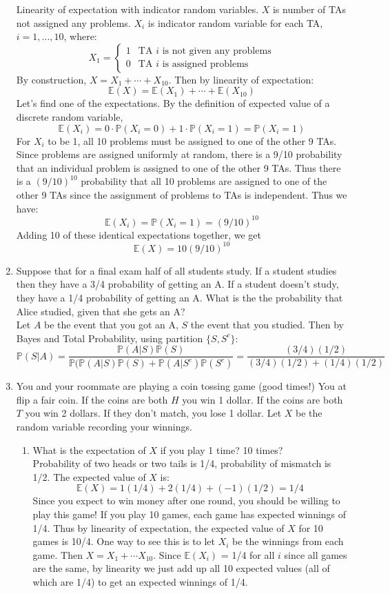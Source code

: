 \documentclass[12pt]{article}
\def\P{{\mathbb P}}
\def\E{{\mathbb E}}
\begin{document}
\begin{enumerate}
Linearity of expectation with indicator random variables. $X$ is number of TAs not assigned any problems. $X_i$ is indicator random variable for each TA, $i = 1, \dots, 10$, where:
\[
X_1 = \begin{cases}
1 & \text{TA $i$ is not given any problems}\\
0 & \text{TA $i$ is assigned problems}
\end{cases}
\]
By construction, $X = X_1 + \cdots + X_{10}$. Then by linearity of expectation:
\[
\E(X) = \E(X_1) + \cdots + \E(X_{10}) 
\]
Let's find one of the expectations. By the definition of expected value of a discrete random variable,
\[
\E(X_i) = 0 \cdot \P(X_i = 0) + 1 \cdot \P(X_i = 1) = \P(X_i = 1)
\]
For $X_i$ to be 1, all 10 problems must be assigned to one of the other 9 TAs. Since problems are assigned uniformly at random, there is a 9/10 probability that an individual problem is assigned to one of the other 9 TAs. Thus there is a $(9/10)^10$ probability that all 10 problems are assigned to one of the other 9 TAs since the assignment of problems to TAs is independent. Thus we have:
\[
\E(X_i) = \P(X_i = 1) = (9/10)^10
\]
Adding 10 of these identical expectations together, we get
\[
\E(X) = 10 (9/10)^10
\]

\item Suppose that for a final exam half of all students study. If a student studies then they have a 3/4 probability of getting an A. If a student doesn’t study, they have a 1/4 probability of getting an A. What is the the probability that Alice studied, given that she gets an A?\\

Let $A$ be the event that you got an A, $S$ the event that you studied. Then by Bayes and Total Probability, using partition $\{S, S^c\}$:
\[
\P(S|A) = \frac{ \P(A|S)\P(S)}{\P(\P(A|S)\P(S) + \P(A|S^c)\P(S^c)} = \frac{(3/4)(1/2)}{(3/4)(1/2) + (1/4)(1/2)}
\]

\item You and your roommate are playing a coin tossing game (good times!) You at flip a fair coin. If the coins are both $H$ you win 1 dollar. If the coins are both $T$ you win 2 dollars. If they don't match, you lose 1 dollar. Let $X$ be the random variable recording your winnings.
\begin{enumerate}
\item What is the expectation of $X$ if you play 1 time? 10 times? \\

Probability of two heads or two tails is 1/4, probability of mismatch is 1/2. The expected value of $X$ is:
\[
\E(X) = 1(1/4) + 2(1/4) + (-1)(1/2) = 1/4
\]
Since you expect to win money after one round, you should be willing to play this game! If you play 10 games, each game has expected winnings of 1/4. Thus by linearity of expectation, the expected value of $X$ for 10 games is 10/4. One way to see this is to let $X_i$ be the winnings from each game. Then $X = X_1 + \cdots X_{10}$. Since $\E(X_i)$ = 1/4 for all $i$ since all games are the same, by linearity we just add up all 10 expected values (all of which are 1/4) to get an expected winnings of 1/4.


\end{enumerate}
\end{enumerate}
\end{document}

